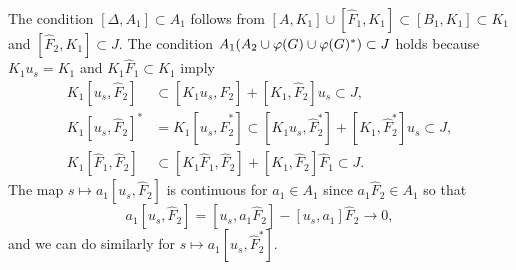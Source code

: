\documentclass{../../large}
\begin{document}
\begin{pf}
The condition $[\Delta,A_1]\subset A_1$ follows from $[A,K_1]\cup[\hat F_1,K_1]\subset[B_1,K_1]\subset K_1$ and $[\hat F_2,K_1]\subset J$.
The condition $A_1(A_2\cup\varphi(G)\cup\varphi(G)^*)\subset J$ holds because $K_1u_s=K_1$ and $K_1\hat F_1\subset K_1$ imply
\begin{align*}
K_1[u_s,\hat F_2]&\subset[K_1u_s,\hat F_2]+[K_1,\hat F_2]u_s\subset J,\\
K_1[u_s,\hat F_2]^*&=K_1[u_s,\hat F_2^*]\subset[K_1u_s,\hat F_2^*]+[K_1,\hat F_2^*]u_s\subset J,\\
K_1[\hat F_1,\hat F_2]&\subset[K_1\hat F_1,\hat F_2]+[K_1,\hat F_2]\hat F_1\subset J.
\end{align*}
The map $s\mapsto a_1[u_s,\hat F_2]$ is continuous for $a_1\in A_1$ since $a_1\hat F_2\in A_1$ so that
\[a_1[u_s,\hat F_2]=[u_s,a_1\hat F_2]-[u_s,a_1]\hat F_2\to0,\]
and we can do similarly for $s\mapsto a_1[u_s,\hat F_2^*]$.
\end{pf}
\end{document}
